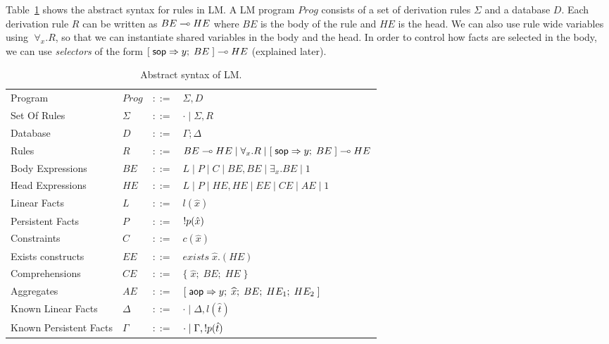 
\newcommand{\selector}[0]{[\; \m{sop} \Rightarrow y; \; BE \;] \lolli HE}
\newcommand{\comprehension}[0]{\{ \; \widehat{x}; \; BE; \; HE \; \}}
\newcommand{\aggregate}[0]{[\;\m{aop} \Rightarrow y; \; \widehat{x}; \; BE; \; HE_1; \; HE_2 \;]}

Table~\ref{tbl:ast} shows the abstract syntax for rules in LM.
A LM program $Prog$ consists of a set of derivation rules $\Sigma$ and a database $D$.
Each derivation rule $R$ can be written as $BE \multimap HE$ where $BE$ is the body of the rule and
$HE$ is the head. We can also use rule wide variables using $\; \forall_{x}. R$, so that we can instantiate
shared variables in the body and the head.
In order to control how facts are selected in the body, we can use \emph{selectors} of
the form $\selector$ (explained later).

\begin{table}[h]
\centering
\begin{tabular}{ l l c l }
  Program & $Prog$ & $::=$ & $\Sigma, D$ \\
  Set Of Rules & $\Sigma$ & $::=$ & $\cdot \; | \; \Sigma, R$\\
  Database & $D$ & $::=$ & $\Gamma; \Delta$ \\
  Rules & $R$ & $::=$ & $BE \lolli HE \; | \; \forall_{x}. R \; | \; \selector$ \\
  Body Expressions & $BE$ & $::=$ & $L \; | \; P \; | \; C \; | \; BE, BE \; | \; \exists_{x}. BE \; | \; 1$\\
  Head Expressions & $HE$ & $::=$ & $L \; | \; P \; | \; HE, HE \; | \; EE \; | \; CE \; | \; AE \; | \; 1$\\
  
  Linear Facts & $L$ & $::=$ & $l(\hat{x})$\\
  Persistent Facts & $P$ & $::=$ & ${!} p(\hat{x})$\\
  Constraints & $C$ & $::=$ & $c(\hat{x})$ \\
  
  Exists constructs & $EE$ & $::=$ & $exists \; \widehat{x}. (HE)$ \\
  Comprehensions & $CE$ & $::=$ & $\comprehension$ \\
  Aggregates & $AE$ & $::=$ & $\aggregate$ \\
  
  Known Linear Facts & $\Delta$ & $::=$ & $\cdot \; | \; \Delta, l(\hat{t})$ \\
  Known Persistent Facts & $\Gamma$ & $::=$ & $\cdot \; | \; \Gamma, {!} p(\hat{t})$ \\
\end{tabular}
\caption{Abstract syntax of LM.}\label{tbl:ast}
\end{table}

